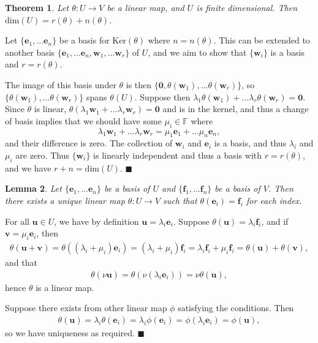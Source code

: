 \documentclass[letter-paper]{tufte-book}
\newtheorem{theorem}{\color{pastel-blue}Theorem}[section]
\newtheorem{lemma}[theorem]{\color{pastel-blue}Lemma}
\newenvironment{proof}[1][Proof]{\begin{trivlist}
\item[\hskip \labelsep {\bfseries #1}]}{\end{trivlist}}
\newcommand{\Ob}{{\boldsymbol{0}}}
\newcommand{\eb}{{\boldsymbol{e}}}
\newcommand{\fb}{{\boldsymbol{f}}}
\newcommand{\ub}{{\boldsymbol{u}}}
\newcommand{\vb}{{\boldsymbol{v}}}
\newcommand{\wb}{{\boldsymbol{w}}}
\newcommand{\qed}{\hfill$\blacksquare$}
\begin{document}
\begin{theorem}\label{thm:rank_dim}
  Let $\theta: U \to V$ be a linear map, and $U$ is finite dimensional. Then $\mbox{dim}(U) = r(\theta) + n(\theta)$.
\end{theorem}

\begin{proof}
  Let $\{\eb_1, \ldots \eb_n\}$ be a basis for $\mbox{Ker}(\theta)$ where $n = n(\theta)$. This can be extended to another basis $\{\eb_1, \ldots \eb_n, \wb_1, \ldots \wb_r\}$ of $U$, and we aim to show that $\{\wb_i\}$ is a basis and $r = r(\theta)$. 
  
  The image of this basis under $\theta$ is then $\{\Ob, \theta(\wb_1), \ldots \theta(\wb_r)\}$, so $\{\theta(\wb_1), \ldots \theta(\wb_r)\}$ spans $\theta(U)$. Suppose then $\lambda_1 \theta(\wb_1) + \ldots \lambda_r \theta(\wb_r) = \Ob$. Since $\theta$ is linear, $\theta(\lambda_1 \wb_1 + \ldots \lambda_r \wb_r) = \Ob$ and is in the kernel, and thus a change of basis implies that we should have some $\mu_i \in \mathbb{F}$ where
  \begin{equation*}
    \lambda_1 \wb_1 + \ldots \lambda_r \wb_r = \mu_1 \eb_1 + \ldots \mu_n \eb_n,
  \end{equation*}
  and their difference is zero. The collection of $\wb_i$ and $\eb_i$ is a basis, and thus $\lambda_i$ and $\mu_i$ are zero. Thus $\{\wb_i\}$ is linearly independent and thus a basis with $r = r(\theta)$, and we have $r + n = \mbox{dim}(U)$. \qed
\end{proof}

\begin{lemma}\label{lem:unique_basis}
  Let $\{\eb_1, \ldots \eb_n\}$ be a basis of $U$ and $\{\fb_1, \ldots \fb_n\}$ be a basis of $V$. Then there exists a unique linear map $\theta : U \to V$ such that $\theta(\eb_i) = \fb_i$ for each index.
\end{lemma}

\begin{proof}
  For all $\ub \in U$, we have by definition $\ub = \lambda_i \eb_i$. Suppose $\theta(\ub) = \lambda_i \fb_i$, and if $\vb = \mu_i \eb_i$, then
  \begin{align*}
    \theta(\ub + \vb) = \theta( (\lambda_i + \mu_i) \eb_i ) = (\lambda_i + \mu_i) \fb_i = \lambda_i \fb_i + \mu_i \fb_i = \theta(\ub) + \theta(\vb),
  \end{align*}
  and that
  \begin{align*}
    \theta(\nu\ub) = \theta(\nu (\lambda_i \eb_i) ) = \nu \theta(\ub),
  \end{align*}
  hence $\theta$ is a linear map.
  
  Suppose there exists from other linear map $\phi$ satisfying the conditions. Then
  \begin{align*}
    \theta(\ub) = \lambda_i \theta(\eb_i) = \lambda_i \phi(\eb_i) = \phi(\lambda_i \eb_i) = \phi(\ub),
  \end{align*}
  so we have uniqueness as required. \qed
\end{proof}
\end{document}

